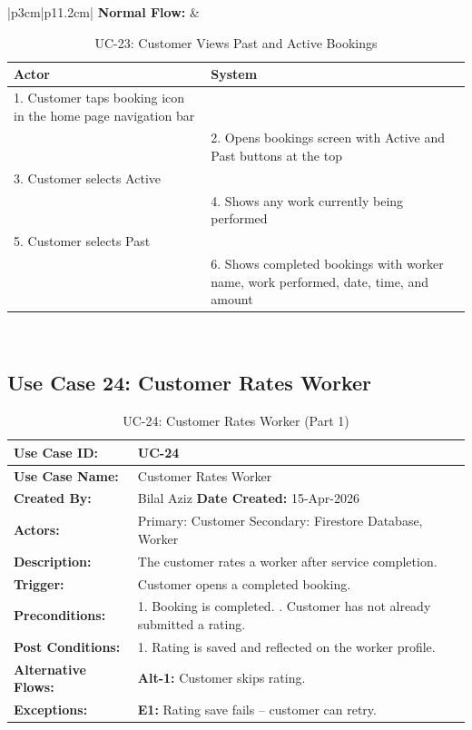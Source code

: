 {\small
\renewcommand{\arraystretch}{1.05}
\begin{table}[H]
\centering
\begin{tabular}{|p{3cm}|p{11.2cm}|}
\hline
\textbf{Normal Flow:} &
\begin{tabular}[t]{|p{5.4cm}|p{5.4cm}|}
\hline
\textbf{Actor} & \textbf{System} \\ \hline
1. Customer taps booking icon in the home page navigation bar & \\ \hline
 & 2. Opens bookings screen with Active and Past buttons at the top \\ \hline
3. Customer selects Active & \\ \hline
 & 4. Shows any work currently being performed \\ \hline
5. Customer selects Past & \\ \hline
 & 6. Shows completed bookings with worker name, work performed, date, time, and amount \\ \hline
\end{tabular} \\ \hline
\end{tabular}
\caption{UC-23: Customer Views Past and Active Bookings}
\end{table}
}

\newpage

\subsection*{Use Case 24: Customer Rates Worker}

{\small
\renewcommand{\arraystretch}{1.05}
\begin{table}[H]
\centering
\begin{tabular}{|p{3cm}|p{11.2cm}|}
\hline
\textbf{Use Case ID:} & UC-24 \\ \hline
\textbf{Use Case Name:} & Customer Rates Worker \\ \hline
\textbf{Created By:} & Bilal Aziz \hfill \textbf{Date Created:} 15-Apr-2026 \\ \hline
\textbf{Actors:} & Primary: Customer \quad Secondary: Firestore Database, Worker \\ \hline
\textbf{Description:} & The customer rates a worker after service completion. \\ \hline
\textbf{Trigger:} & Customer opens a completed booking. \\ \hline
\textbf{Preconditions:} & 1. Booking is completed. \newline 2. Customer has not already submitted a rating. \\ \hline
\textbf{Post Conditions:} & 1. Rating is saved and reflected on the worker profile. \\ \hline
\textbf{Alternative Flows:} & \textbf{Alt-1:} Customer skips rating. \\ \hline
\textbf{Exceptions:} & \textbf{E1:} Rating save fails -- customer can retry. \\ \hline
\end{tabular}
\caption*{UC-24: Customer Rates Worker (Part 1)}
\end{table}
}

